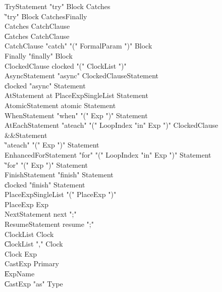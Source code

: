 \begin{grammar}

 TryStatement  \:   \xcd"try"  Block  Catches\\
    \|   \xcd"try"  Block  Catches\opt  Finally\\
 Catches  \:   CatchClause\\
    \|   Catches  CatchClause\\
 CatchClause  \:   \xcd"catch"  \xcd"("  FormalParam  \xcd")"  Block\\
 Finally  \:   \xcd"finally"  Block\\
 ClockedClause  \:   clocked  \xcd"("  ClockList  \xcd")"\\
 AsyncStatement  \:   \xcd"async"  ClockedClause\opt  Statement\\
    \|   clocked  \xcd"async"  Statement\\
 AtStatement  \:   at  PlaceExpSingleList  Statement\\
 AtomicStatement  \:   atomic  Statement\\
 WhenStatement  \:   \xcd"when"  \xcd"("  Exp  \xcd")"  Statement\\
 AtEachStatement  \:   \xcd"ateach"  \xcd"("  LoopIndex  \xcd"in"  Exp  \xcd")"  ClockedClause\opt\\
          &&Statement\\
    \|   \xcd"ateach"  \xcd"("  Exp  \xcd")"  Statement\\
 EnhancedForStatement  \:   \xcd"for"  \xcd"("  LoopIndex  \xcd"in"  Exp  \xcd")"  Statement\\
    \|   \xcd"for"  \xcd"("  Exp  \xcd")"  Statement\\
 FinishStatement  \:   \xcd"finish"  Statement\\
    \|   clocked  \xcd"finish"  Statement\\
 PlaceExpSingleList  \:   \xcd"("  PlaceExp  \xcd")"\\
 PlaceExp  \:   Exp\\
 NextStatement  \:   next  \xcd";"\\
 ResumeStatement  \:   resume  \xcd";"\\
 ClockList  \:   Clock\\
    \|   ClockList  \xcd","  Clock\\
 Clock  \:   Exp\\
 CastExp  \:   Primary\\
    \|   ExpName\\
    \|   CastExp  \xcd"as"  Type\\

\end{grammar}
